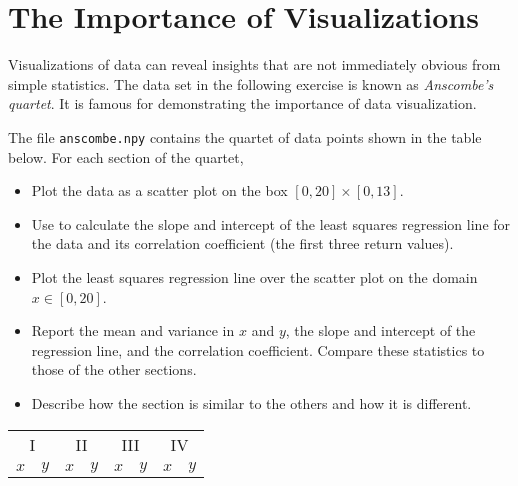 \label{lab:DataVis}

\section*{The Importance of Visualizations} %

Visualizations of data can reveal insights that are not immediately obvious from simple statistics.
The data set in the following exercise is known as \emph{Anscombe's quartet}.
It is famous for demonstrating the importance of data visualization.

\begin{problem} %
The file \texttt{anscombe.npy} contains the quartet of data points shown in the table below.
For each section of the quartet,
\begin{itemize}
	\setlength\itemsep{0em}
	\item Plot the data as a scatter plot on the box $[0,20]\times[0,13]$.
    \item Use  to calculate the slope and intercept of the least squares regression line for the data and its correlation coefficient (the first three return values).
	\item Plot the least squares regression line over the scatter plot on the domain $x \in [0,20]$.
	\item Report the mean and variance in $x$ and $y$, the slope and intercept of the regression line, and the correlation coefficient.
    Compare these statistics to those of the other sections.
	\item Describe how the section is similar to the others and how it is different.
\end{itemize}
\begin{table}[H]
\scriptsize{
\begin{tabular}{rr|rr|rr|rr}
    \multicolumn{2}{c|}{I}    & \multicolumn{2}{|c|}{II} &
    \multicolumn{2}{|c|}{III} & \multicolumn{2}{|c}{IV} \\
    \multicolumn{1}{c}{$x$}   & \multicolumn{1}{c|}{$y$} &
    \multicolumn{1}{|c}{$x$}  & \multicolumn{1}{c|}{$y$} &
    \multicolumn{1}{|c}{$x$}  & \multicolumn{1}{c|}{$y$} &
    \multicolumn{1}{|c}{$x$}  & \multicolumn{1}{c}{$y$} \\

\end{tabular}}
\end{table}
\end{problem}

